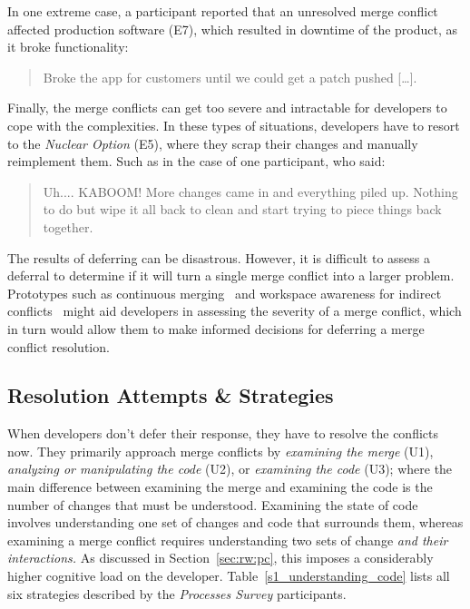 In one extreme case, a participant reported that an unresolved merge conflict affected production software (E7), which resulted in downtime of the product, as it broke functionality:
\begin{quotation}
	Broke the app for customers until we could get a patch pushed [\ldots].
\end{quotation}
Finally, the merge conflicts can get too severe and intractable for developers to cope with the complexities.
In these types of situations, developers have to resort to the \emph{Nuclear Option} (E5), where they scrap their changes and manually reimplement them.
Such as in the case of one participant, who said:
\begin{quotation}
	Uh.... KABOOM! More changes came in and everything piled up. Nothing to do but wipe it all back to clean and start trying to piece things back together.
\end{quotation}

The results of deferring can be disastrous. 
However, it is difficult to assess a deferral to determine if it will turn a single merge conflict into a larger problem.
Prototypes such as continuous merging~\cite{Guimaraes} and workspace awareness for indirect conflicts~\cite{sarma2007towards} might aid developers in assessing the severity of a merge conflict, which in turn would allow them to make informed decisions for deferring a merge conflict resolution.

\subsection{Resolution Attempts \& Strategies}

When developers don't defer their response, they have to resolve the conflicts now.
They primarily approach merge conflicts by \textit{examining the merge} (U1), \textit{analyzing or manipulating the code} (U2), or \textit{examining the code} (U3); where the main difference between examining the merge and examining the code is the number of changes that must be understood.
Examining the state of code involves understanding one set of changes and code that surrounds them, whereas examining a merge conflict requires understanding two sets of change \emph{and their interactions.}
As discussed in Section~\ref{sec:rw:pc}, this imposes a considerably higher cognitive load on the developer.
Table~\ref{s1_understanding_code} lists all six strategies described by the \textit{Processes Survey} participants.

